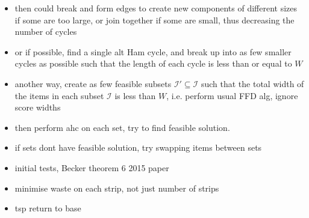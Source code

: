 \documentclass[oribibl]{llncs}
\begin{document}
\begin{itemize}
	\item then could break and form edges to create new components of different sizes if some are too large, or join together if some are small, thus decreasing the number of cycles
	\item or if possible, find a single alt Ham cycle, and break up into as few smaller cycles as possible such that the length of each cycle is less than or equal to $W$
	\item another way, create as few feasible subsets $\mathcal{I}' \subseteq \mathcal{I}$ such that the total width of the items in each subset $\mathcal{I}$ is less than $W$, i.e. perform usual FFD alg, ignore score widths
	\item then perform ahc on each set, try to find feasible solution.
	\item if sets dont have feasible solution, try swapping items between sets
	\item initial tests, Becker theorem 6 2015 paper \cite{garraffa2016}
	\item minimise waste on each strip, not just number of strips
	\item tsp return to base
\end{itemize}
\end{document}
